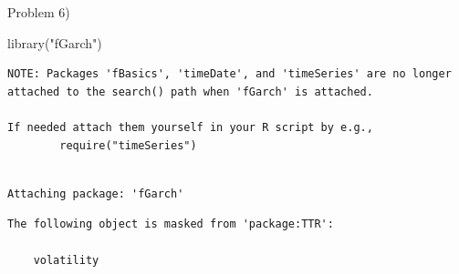 \documentclass[
  letterpaper,
  DIV=11,
  numbers=noendperiod]{scrartcl}
\newenvironment{Shaded}{\begin{snugshade}}{\end{snugshade}}
\newcommand{\FunctionTok}[1]{\textcolor[rgb]{0.28,0.35,0.67}{#1}}
\newcommand{\NormalTok}[1]{\textcolor[rgb]{0.00,0.23,0.31}{#1}}
\newcommand{\StringTok}[1]{\textcolor[rgb]{0.13,0.47,0.30}{#1}}
\begin{document}
Problem 6)

\begin{Shaded}
\begin{Highlighting}[]
\FunctionTok{library}\NormalTok{(}\StringTok{"fGarch"}\NormalTok{)}
\end{Highlighting}
\end{Shaded}

\begin{verbatim}
NOTE: Packages 'fBasics', 'timeDate', and 'timeSeries' are no longer
attached to the search() path when 'fGarch' is attached.

If needed attach them yourself in your R script by e.g.,
        require("timeSeries")
\end{verbatim}

\begin{verbatim}

Attaching package: 'fGarch'
\end{verbatim}

\begin{verbatim}
The following object is masked from 'package:TTR':

    volatility
\end{verbatim}
\end{document}
